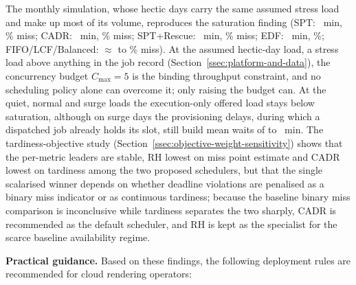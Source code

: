 {The monthly simulation, whose hectic days carry the same assumed stress load and make up most of its volume, reproduces the saturation finding (SPT: \PhFourSPTwait~min, \PhFourSPTmiss\% miss; CADR: \PhFourCADRwait~min, \PhFourCADRMiss\% miss; SPT+Rescue: \PhFourRescueWait~min, \PhFourRescueMiss\% miss; EDF: \PhFourEDFwait~min, \PhFourEDFmiss\%; FIFO/\allowbreak LCF/\allowbreak Balanced: ${\approx}$\PhFourFIFOmiss{} to \PhFourLCFmiss\% miss). At the assumed hectic-day load, a stress load above anything in the job record (Section~\ref{ssec:platform-and-data}), the concurrency budget $C_{\max}=5$ is the binding throughput constraint, and no scheduling policy alone can overcome it; only raising the budget can. At the quiet, normal and surge loads the execution-only offered load stays below saturation, although on surge days the provisioning delays, during which a dispatched job already holds its slot, still build mean waits of \SensSrgDayWaitLo{} to \SensSrgDayWaitHi{}~min. The tardiness-objective study (Section~\ref{ssec:objective-weight-sensitivity}) shows that the per-metric leaders are stable, RH lowest on miss point estimate and CADR lowest on tardiness among the two proposed schedulers, but that the single scalarised winner depends on whether deadline violations are penalised as a binary miss indicator or as continuous tardiness; because the baseline binary miss comparison is inconclusive while tardiness separates the two sharply, CADR is recommended as the default scheduler, and RH is kept as the specialist for the scarce baseline availability regime.

\textbf{Practical guidance.} Based on these findings, the following deployment rules are recommended for cloud rendering operators:

}
